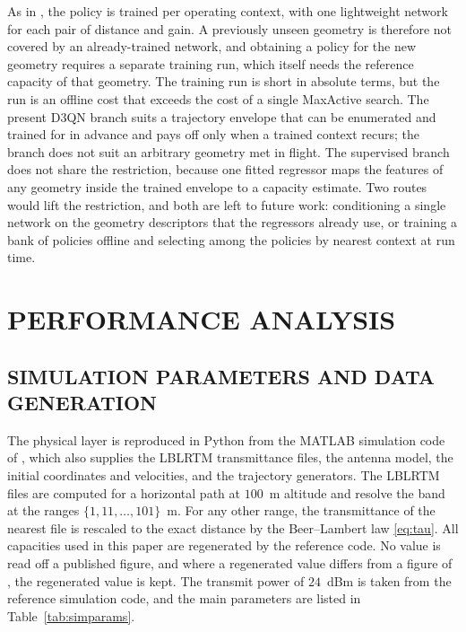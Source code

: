 \documentclass{ieee-ojvt}
\begin{document}
As in \cite{elcik2025d3qn}, the policy is trained per operating context, with one
lightweight network for each pair of distance and gain. A previously unseen geometry is
therefore not covered by an already-trained network, and obtaining a policy for the new geometry requires a separate training run,
which itself needs the reference capacity of that geometry. The training run is short in
absolute terms, but the run is an offline cost that exceeds the cost of a single
MaxActive search. The present D3QN branch suits a trajectory envelope that can be
enumerated and trained for in advance and pays off only when a trained context recurs;
the branch does not suit an arbitrary geometry met in flight. The supervised branch does
not share the restriction, because one fitted regressor maps the features of any geometry
inside the trained envelope to a capacity estimate. Two routes would lift the
restriction, and both are left to future work: conditioning a single network on the
geometry descriptors that the regressors already use, or training a bank of policies
offline and selecting among the policies by nearest context at run time.


\section{PERFORMANCE ANALYSIS}
\label{sec:perf}
\subsection{SIMULATION PARAMETERS AND DATA GENERATION}
\label{sec:setup}
The physical layer is reproduced in Python from the MATLAB simulation code of
\cite{10399804}, which also supplies the LBLRTM transmittance files, the antenna
model, the initial coordinates and velocities, and the trajectory generators. The LBLRTM
files are computed for a horizontal path at $100$~m altitude and resolve the band at the
ranges $\{1,11,\dots,101\}$~m. For any other range, the transmittance of the nearest file
is rescaled to the exact distance by the Beer--Lambert law \eqref{eq:tau}. All capacities
used in this paper are regenerated by the reference code. No value is read off a
published figure, and where a regenerated value differs from a figure of
\cite{10399804}, the regenerated value is kept. The transmit power of $24$~dBm
is taken from the reference simulation code, and the main parameters are listed in
Table~\ref{tab:simparams}.
\end{document}
